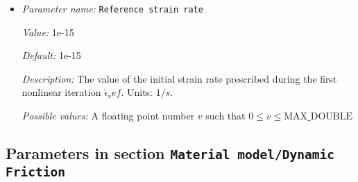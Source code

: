 \begin{itemize}
{\it Default:} 1e19


{\it Description:} The value of the minimum viscosity cutoff $\eta_min$. Units: $Pa\;s$.


{\it Possible values:} A floating point number $v$ such that $0 \leq v \leq \text{MAX\_DOUBLE}$
\item {\it Parameter name:} {\tt Reference strain rate}
\label{parameters:Material model/Drucker Prager/Viscosity/Reference strain rate}


{\it Value:} 1e-15


{\it Default:} 1e-15


{\it Description:} The value of the initial strain rate prescribed during the first nonlinear iteration $\dot{\epsilon}_ref$. Units: $1/s$.


{\it Possible values:} A floating point number $v$ such that $0 \leq v \leq \text{MAX\_DOUBLE}$
\end{itemize}

\subsection{Parameters in section \tt Material model/Dynamic Friction}
\label{parameters:Material_20model/Dynamic_20Friction}


